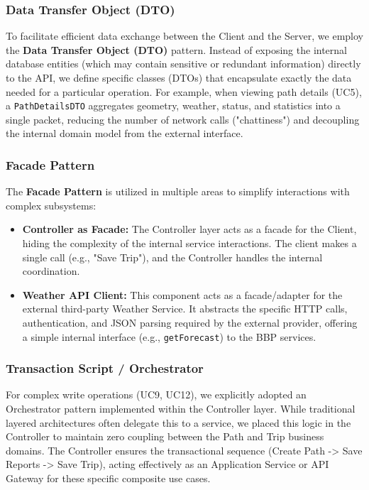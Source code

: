 \subsubsection{Data Transfer Object (DTO)}
To facilitate efficient data exchange between the Client and the Server, we employ the \textbf{Data Transfer Object (DTO)} pattern. Instead of exposing the internal database entities (which may contain sensitive or redundant information) directly to the API, we define specific classes (DTOs) that encapsulate exactly the data needed for a particular operation. For example, when viewing path details (UC5), a \texttt{PathDetailsDTO} aggregates geometry, weather, status, and statistics into a single packet, reducing the number of network calls ("chattiness") and decoupling the internal domain model from the external interface.

\subsubsection{Facade Pattern}
The \textbf{Facade Pattern} is utilized in multiple areas to simplify interactions with complex subsystems:
\begin{itemize}
    \item \textbf{Controller as Facade:} The Controller layer acts as a facade for the Client, hiding the complexity of the internal service interactions. The client makes a single call (e.g., "Save Trip"), and the Controller handles the internal coordination.
    \item \textbf{Weather API Client:} This component acts as a facade/adapter for the external third-party Weather Service. It abstracts the specific HTTP calls, authentication, and JSON parsing required by the external provider, offering a simple internal interface (e.g., \texttt{getForecast}) to the BBP services.
\end{itemize}

\subsubsection{Transaction Script / Orchestrator}
For complex write operations (UC9, UC12), we explicitly adopted an Orchestrator pattern implemented within the Controller layer. While traditional layered architectures often delegate this to a service, we placed this logic in the Controller to maintain zero coupling between the Path and Trip business domains. The Controller ensures the transactional sequence (Create Path -> Save Reports -> Save Trip), acting effectively as an Application Service or API Gateway for these specific composite use cases.

